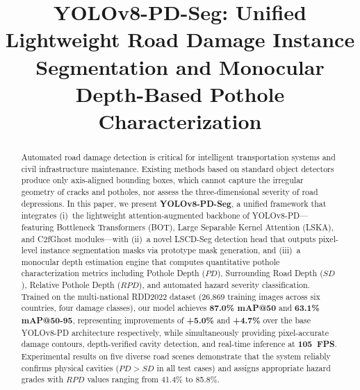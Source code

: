 \documentclass[conference]{IEEEtran}
\begin{document}
\title{YOLOv8-PD-Seg: Unified Lightweight Road Damage Instance Segmentation and Monocular Depth-Based Pothole Characterization}

\author{
}

\maketitle

\begin{abstract}
Automated road damage detection is critical for intelligent transportation systems and civil infrastructure maintenance. Existing methods based on standard object detectors produce only axis-aligned bounding boxes, which cannot capture the irregular geometry of cracks and potholes, nor assess the three-dimensional severity of road depressions. In this paper, we present \textbf{YOLOv8-PD-Seg}, a unified framework that integrates (i)~the lightweight attention-augmented backbone of YOLOv8-PD---featuring Bottleneck Transformers (BOT), Large Separable Kernel Attention (LSKA), and C2fGhost modules---with (ii)~a novel LSCD-Seg detection head that outputs pixel-level instance segmentation masks via prototype mask generation, and (iii)~a monocular depth estimation engine that computes quantitative pothole characterization metrics including Pothole Depth ($PD$), Surrounding Road Depth ($SD$), Relative Pothole Depth ($RPD$), and automated hazard severity classification. Trained on the multi-national RDD2022 dataset (26,869 training images across six countries, four damage classes), our model achieves \textbf{87.0\% mAP@50} and \textbf{63.1\% mAP@50-95}, representing improvements of \textbf{+5.0\%} and \textbf{+4.7\%} over the base YOLOv8-PD architecture respectively, while simultaneously providing pixel-accurate damage contours, depth-verified cavity detection, and real-time inference at \textbf{105~FPS}. Experimental results on five diverse road scenes demonstrate that the system reliably confirms physical cavities ($PD > SD$ in all test cases) and assigns appropriate hazard grades with $RPD$ values ranging from 41.4\% to 85.8\%.
\end{abstract}
\end{document}
